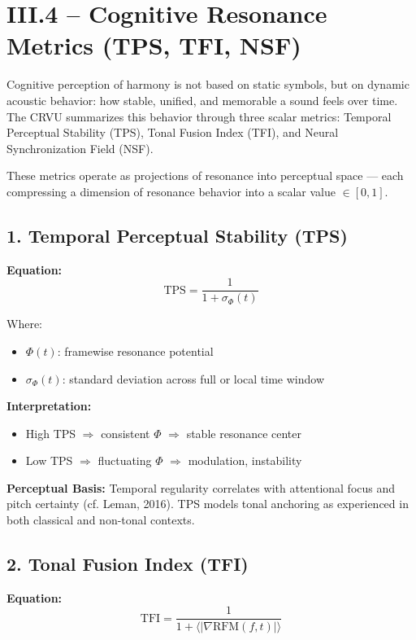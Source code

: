 \section*{III.4 – Cognitive Resonance Metrics (TPS, TFI, NSF)}

Cognitive perception of harmony is not based on static symbols, but on dynamic acoustic behavior: how stable, unified, and memorable a sound feels over time. The CRVU summarizes this behavior through three scalar metrics: Temporal Perceptual Stability (TPS), Tonal Fusion Index (TFI), and Neural Synchronization Field (NSF).

These metrics operate as projections of resonance into perceptual space — each compressing a dimension of resonance behavior into a scalar value $\in [0, 1]$.

\subsection*{1. Temporal Perceptual Stability (TPS)}

\textbf{Equation:}
\[
\text{TPS} = \frac{1}{1 + \sigma_\Phi(t)}
\]

Where:

\begin{itemize}
    \item $\Phi(t)$: framewise resonance potential
    \item $\sigma_\Phi(t)$: standard deviation across full or local time window
\end{itemize}

\textbf{Interpretation:}

\begin{itemize}
    \item High TPS $\Rightarrow$ consistent $\Phi$ $\Rightarrow$ stable resonance center
    \item Low TPS $\Rightarrow$ fluctuating $\Phi$ $\Rightarrow$ modulation, instability
\end{itemize}

\textbf{Perceptual Basis:} Temporal regularity correlates with attentional focus and pitch certainty (cf. Leman, 2016). TPS models tonal anchoring as experienced in both classical and non-tonal contexts.

\subsection*{2. Tonal Fusion Index (TFI)}

\textbf{Equation:}
\[
\text{TFI} = \frac{1}{1 + \langle |\nabla \text{RFM}(f, t)| \rangle}
\]

